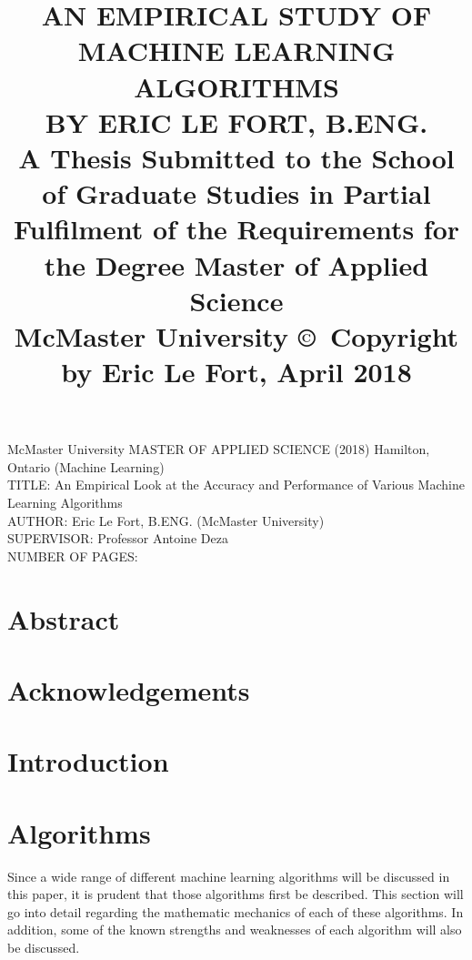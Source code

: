 \documentclass[titlepage]{article}
\title{
	AN EMPIRICAL STUDY OF MACHINE LEARNING ALGORITHMS\\[20mm]
	BY ERIC LE FORT, B.ENG.\\[20mm]
	\large A Thesis Submitted to the School of Graduate Studies in Partial Fulfilment of the Requirements for the Degree Master of Applied Science\\[20mm]
	McMaster University \copyright~Copyright by Eric Le Fort, April 2018
}\date{}
\begin{document}
\maketitle\normalsize\setcounter{page}{2}
\noindent McMaster University MASTER OF APPLIED SCIENCE (2018) Hamilton, \mbox{Ontario} (Machine Learning)\\[10mm]
TITLE: An Empirical Look at the Accuracy and Performance of Various \mbox{Machine} Learning Algorithms\\
AUTHOR: Eric Le Fort, B.ENG. (McMaster University)\\
SUPERVISOR: Professor Antoine Deza\\
NUMBER OF PAGES: \pageref{LastPage}%

\newpage
\section{Abstract}%



\newpage
\section{Acknowledgements}%



\newpage
\tableofcontents
\listoftables
\listoffigures



\newpage
\section{Introduction}%



\section{Algorithms}
Since a wide range of different machine learning algorithms will be discussed in this paper, it is prudent that those algorithms first be described. This section will go into detail regarding the mathematic mechanics of each of these algorithms. In addition, some of the known strengths and weaknesses of each algorithm will also be discussed.
\end{document}

